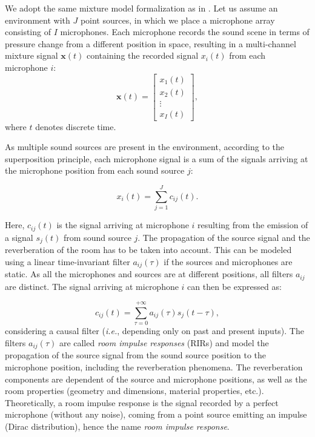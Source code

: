 We adopt the same mixture model formalization as in \cite{vincent_audio_2018}. Let us assume an environment with $J$ point sources, in which we place a microphone array consisting of $I$ microphones. Each microphone records the sound scene in terms of pressure change from a different position in space, resulting in a multi-channel mixture signal $\mathbf{x}(t)$ containing the recorded signal $x_i(t)$ from each microphone $i$:
\begin{equation}
    \mathbf{x}(t) = \begin{bmatrix} x_1(t) \\ x_2(t) \\ \vdots \\ x_I(t) \end{bmatrix},
\end{equation}
where $t$ denotes discrete time.

As multiple sound sources are present in the environment, according to the superposition principle, each microphone signal is a sum of the signals arriving at the microphone position from each sound source $j$:

\begin{equation}
    x_i(t) = \sum_{j=1}^J c_{ij}(t).
\end{equation}

Here, $c_{ij}(t)$ is the signal arriving at microphone $i$ resulting from the emission of a signal $s_j(t)$ from sound source $j$. The propagation of the source signal and the reverberation of the room has to be taken into account. This can be modeled using a linear time-invariant filter $a_{ij}(\tau)$ if the sources and microphones are static. As all the microphones and sources are at different positions, all filters $a_{ij}$ are distinct. The signal arriving at microphone $i$ can then be expressed as:

\begin{equation}\label{eqSRIR}
    c_{ij}(t) = \sum_{\tau=0}^{+\infty} a_{ij}(\tau) s_j(t-\tau),
\end{equation}
considering a causal filter (\emph{i.e.}, depending only on past and present inputs).
The filters $a_{ij}(\tau)$ are called \textit{room impulse responses} (RIRs) and model the propagation of the source signal from the sound source position to the microphone position, including the reverberation phenomena. The reverberation components are dependent of the source and microphone positions, as well as the room properties (geometry and dimensions, material properties, etc.). Theoretically, a room impulse response is the signal recorded by a perfect microphone (without any noise), coming from a point source emitting an impulse (Dirac distribution), hence the name \textit{room impulse response}.

